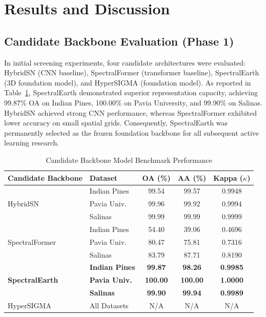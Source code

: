 \documentclass[conference,letterpaper]{IEEEtran}
\begin{document}
\section{Results and Discussion}

\subsection{Candidate Backbone Evaluation (Phase 1)}
In initial screening experiments, four candidate architectures were evaluated: HybridSN \cite{roy2020} (CNN baseline), SpectralFormer \cite{hong2022} (transformer baseline), SpectralEarth \cite{braham2025} (3D foundation model), and HyperSIGMA \cite{wang2025} (foundation model). As reported in Table~\ref{tab:backbone_benchmark}, SpectralEarth demonstrated superior representation capacity, achieving 99.87\% OA on Indian Pines, 100.00\% on Pavia University, and 99.90\% on Salinas. HybridSN achieved strong CNN performance, whereas SpectralFormer exhibited lower accuracy on small spatial grids. Consequently, SpectralEarth was permanently selected as the frozen foundation backbone for all subsequent active learning research.

\begin{table}[!t]
\caption{Candidate Backbone Model Benchmark Performance}
\label{tab:backbone_benchmark}
\centering
\footnotesize
\setlength{\tabcolsep}{3.5pt}
\begin{tabular}{|l|l|c|c|c|}
\hline
\textbf{Candidate Backbone} & \textbf{Dataset} & \textbf{OA (\%)} & \textbf{AA (\%)} & \textbf{Kappa ($\kappa$)} \\
\hline
\multirow{3}{*}{HybridSN \cite{roy2020}} 
 & Indian Pines & 99.54 & 99.57 & 0.9948 \\
\cline{2-5}
 & Pavia Univ.  & 99.96 & 99.92 & 0.9994 \\
\cline{2-5}
 & Salinas      & 99.99 & 99.99 & 0.9999 \\
\hline
\multirow{3}{*}{SpectralFormer \cite{hong2022}} 
 & Indian Pines & 54.40 & 39.06 & 0.4696 \\
\cline{2-5}
 & Pavia Univ.  & 80.47 & 75.81 & 0.7316 \\
\cline{2-5}
 & Salinas      & 83.79 & 87.71 & 0.8190 \\
\hline
\multirow{3}{*}{\textbf{SpectralEarth} \cite{braham2025}} 
 & \textbf{Indian Pines} & \textbf{99.87} & \textbf{98.26} & \textbf{0.9985} \\
\cline{2-5}
 & \textbf{Pavia Univ.}  & \textbf{100.00} & \textbf{100.00} & \textbf{1.0000} \\
\cline{2-5}
 & \textbf{Salinas}      & \textbf{99.90} & \textbf{99.94} & \textbf{0.9989} \\
\hline
HyperSIGMA \cite{wang2025} & All Datasets & N/A & N/A & N/A \\
\hline
\end{tabular}
\end{table}
\end{document}
